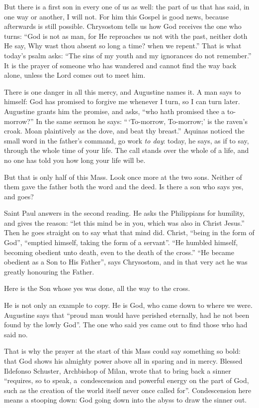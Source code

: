 But there is a first son in every one of us as well: the part of us that has
said, in one way or another, I will not. For him this Gospel is good news,
because afterwards is still possible. Chrysostom tells us how God receives the
one who turns: ``God is not as man, for He reproaches us not with the past,
neither doth He say, Why wast thou absent so long a time? when we repent.''
That is what today's psalm asks: ``The sins of my youth and my ignorances do
not remember.'' It is the prayer of someone who has wandered and cannot find
the way back alone, unless the Lord comes out to meet him.

There is one danger in all this mercy, and Augustine names it. A man says to
himself: God has promised to forgive me whenever I turn, so I can turn later.
Augustine grants him the promise, and asks, ``who hath promised thee a
to-morrow?'' In the same sermon he says: ``\,`To-morrow, To-morrow;' is the
raven's croak. Moan plaintively as the dove, and beat thy breast.'' Aquinas
noticed the small word in the father's command, go work \emph{to day}: today,
he says, as if to say, through the whole time of your life. The call stands
over the whole of a life, and no one has told you how long your life will be.

\bigskip

But that is only half of this Mass. Look once more at the two sons. Neither of
them gave the father both the word and the deed. Is there a son who says yes,
and goes?

Saint Paul answers in the second reading. He asks the Philippians for
humility, and gives the reason: ``let this mind be in you, which was also in
Christ Jesus.'' Then he goes straight on to say what that mind did. Christ,
``being in the form of God'', ``emptied himself, taking the form of a
servant''. ``He humbled himself, becoming obedient unto death, even to the
death of the cross.'' ``He became obedient as a Son to His Father'', says
Chrysostom, and in that very act he was greatly honouring the Father.

Here is the Son whose yes was done, all the way to the cross.

He is not only an example to copy. He is God, who came down to where we were.
Augustine says that ``proud man would have perished eternally, had he not been
found by the lowly God''. The one who said yes came out to find those who had
said no.

That is why the prayer at the start of this Mass could say something so bold:
that God shows his almighty power above all in sparing and in mercy. Blessed
Ildefonso Schuster, Archbishop of Milan, wrote that to bring back a sinner
``requires, so to speak, a~condescension and powerful energy on the part of
God, such as the creation of the world itself never once called for''.
Condescension here means a stooping down: God going down into the abyss to
draw the sinner out.

